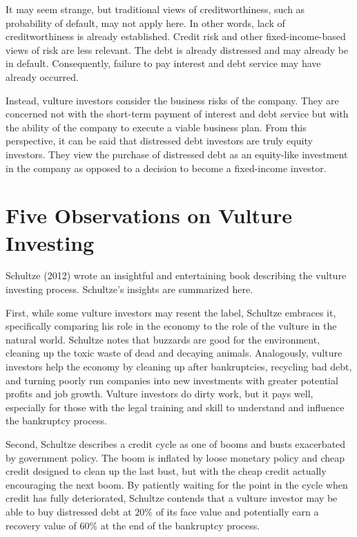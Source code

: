 \documentclass[11pt]{article}
\begin{document}
It may seem strange, but traditional views of creditworthiness, such as probability of default, may not apply here. In other words, lack of creditworthiness is already established. Credit risk and other fixed-income-based views of risk are less relevant. The debt is already distressed and may already be in default. Consequently, failure to pay interest and debt service may have already occurred.

Instead, vulture investors consider the business risks of the company. They are concerned not with the short-term payment of interest and debt service but with the ability of the company to execute a viable business plan. From this perspective, it can be said that distressed debt investors are truly equity investors. They view the purchase of distressed debt as an equity-like investment in the company as opposed to a decision to become a fixed-income investor.

\section*{Five Observations on Vulture Investing}
Schultze (2012) wrote an insightful and entertaining book describing the vulture investing process. Schultze's insights are summarized here.

First, while some vulture investors may resent the label, Schultze embraces it, specifically comparing his role in the economy to the role of the vulture in the natural world. Schultze notes that buzzards are good for the environment, cleaning up the toxic waste of dead and decaying animals. Analogously, vulture investors help the economy by cleaning up after bankruptcies, recycling bad debt, and turning poorly run companies into new investments with greater potential profits and job growth. Vulture investors do dirty work, but it pays well, especially for those with the legal training and skill to understand and influence the bankruptcy process.

Second, Schultze describes a credit cycle as one of booms and busts exacerbated by government policy. The boom is inflated by loose monetary policy and cheap credit designed to clean up the last bust, but with the cheap credit actually encouraging the next boom. By patiently waiting for the point in the cycle when credit has fully deteriorated, Schultze contends that a vulture investor may be able to buy distressed debt at $20 \%$ of its face value and potentially earn a recovery value of $60 \%$ at the end of the bankruptcy process.
\end{document}

